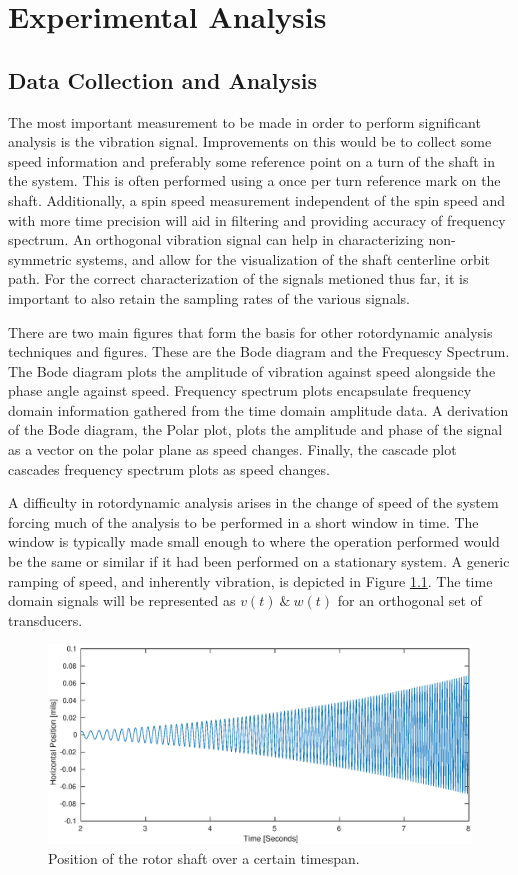 \chapter{Experimental Analysis}
\section{Data Collection and Analysis}
The most important measurement to be made in order to perform significant analysis is the vibration signal. Improvements on this would be to collect some speed information and preferably some reference point on a turn of the shaft in the system. This is often performed using a once per turn reference mark on the shaft. Additionally, a spin speed measurement independent of the spin speed and with more time precision will aid in filtering and providing accuracy of frequency spectrum. An orthogonal vibration signal can help in characterizing non-symmetric systems, and allow for the visualization of the shaft centerline orbit path. For the correct characterization of the signals metioned thus far, it is important to also retain the sampling rates of the various signals.\par
There are two main figures that form the basis for other rotordynamic analysis techniques and figures. These are the Bode diagram and the Frequescy Spectrum. The Bode diagram plots the amplitude of vibration against speed alongside the phase angle  against speed. Frequency spectrum plots encapsulate frequency domain information gathered from the time domain amplitude data. A derivation of the Bode diagram, the Polar plot, plots the amplitude and phase of the signal as a vector on the polar plane as speed changes. Finally, the cascade plot cascades frequency spectrum plots as speed changes.\par
A difficulty in rotordynamic analysis arises in the change of speed of the system forcing much of the analysis to be performed in a short window in time. The window is typically made small enough to where the operation performed would be the same or similar if it had been performed on a stationary system. A generic ramping of speed, and inherently vibration, is depicted in Figure \ref{fig:PosOverTime}. The time domain signals will be represented as $ v(t)\ \&\ w(t) $ for an orthogonal set of transducers.\par 
\begin{figure}
	\centering
	\includegraphics[width=\linewidth]{./figures/Pos_Over_Time.eps}
	\caption{Position of the rotor shaft over a certain timespan.}
	\label{fig:PosOverTime}
\end{figure}
